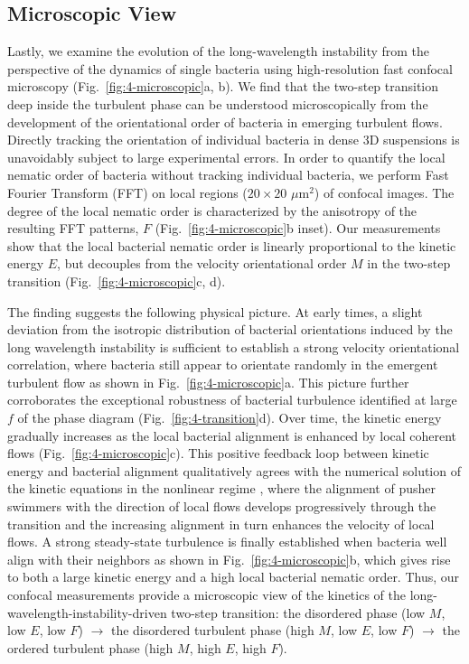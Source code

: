 \subsection{Microscopic View}
Lastly, we examine the evolution of the long-wavelength instability from the perspective of the dynamics of single bacteria using high-resolution fast confocal microscopy (Fig.~\ref{fig:4-microscopic}a, b). We find that the two-step transition deep inside the turbulent phase can be understood microscopically from the development of the orientational order of bacteria in emerging turbulent flows. Directly tracking the orientation of individual bacteria in dense 3D suspensions is unavoidably subject to large experimental errors. In order to quantify the local nematic order of bacteria without tracking individual bacteria, we perform Fast Fourier Transform (FFT) on local regions ($20 \times 20$ $\mu$m$^2$) of confocal images. The degree of the local nematic order is characterized by the anisotropy of the resulting FFT patterns, $F$ (Fig.~\ref{fig:4-microscopic}b inset). Our measurements show that the local bacterial nematic order is linearly proportional to the kinetic energy $E$, but decouples from the velocity orientational order $M$ in the two-step transition (Fig.~\ref{fig:4-microscopic}c, d).

The finding suggests the following physical picture. At early times, a slight deviation from the isotropic distribution of bacterial orientations induced by the long wavelength instability is sufficient to establish a strong velocity orientational correlation, where bacteria still appear to orientate randomly in the emergent turbulent flow as shown in Fig.~\ref{fig:4-microscopic}a. This picture further corroborates the exceptional robustness of bacterial turbulence identified at large $f$ of the phase diagram (Fig.~\ref{fig:4-transition}d). Over time, the kinetic energy gradually increases as the local bacterial alignment is enhanced by local coherent flows (Fig.~\ref{fig:4-microscopic}c). This positive feedback loop between kinetic energy and bacterial alignment qualitatively agrees with the numerical solution of the kinetic equations in the nonlinear regime \cite{Saintillan2008b}, where the alignment of pusher swimmers with the direction of local flows develops progressively through the transition and the increasing alignment in turn enhances the velocity of local flows.
A strong steady-state turbulence is finally established when bacteria well align with their neighbors as shown in Fig.~\ref{fig:4-microscopic}b, which gives rise to both a large kinetic energy and a high local bacterial nematic order. Thus, our confocal measurements provide a microscopic view of the kinetics of the long-wavelength-instability-driven two-step transition: the disordered phase (low $M$, low $E$, low $F$) $\to$ the disordered turbulent phase (high $M$, low $E$, low $F$) $\to$ the ordered turbulent phase (high $M$, high $E$, high $F$).

